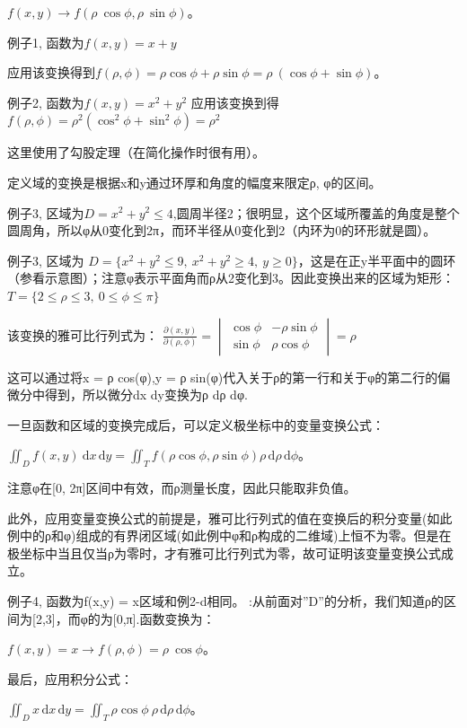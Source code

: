 \documentclass[UTF-8]{ctexart}
\begin{document}
$f(x,y) \rightarrow f(\rho \ \cos \phi,\rho \ \sin \phi )$。

例子1,
函数为$f(x,y) = x + y$

应用该变换得到$f(\rho, \phi) = \rho \cos \phi + \rho \sin \phi = \rho \ (\cos \phi + \sin \phi )$。

例子2,
函数为$f(x,y) = x^2 + y^2$
应用该变换到得$f(\rho, \phi) = \rho^2 (\cos^2 \phi + \sin^2 \phi) = \rho^2$

这里使用了勾股定理（在简化操作时很有用）。

定义域的变换是根据x和y通过环厚和角度的幅度来限定ρ, φ的区间。

例子3,
区域为$D = x^2 + y^2 \le 4$,圆周半径2；很明显，这个区域所覆盖的角度是整个圆周角，所以φ从0变化到2π，而环半径从0变化到2（内环为0的环形就是圆）。

例子3,
区域为 $D = \{ x^2 + y^2 \le 9, \ x^2 + y^2 \ge 4, \ y \ge 0 \}$，这是在正y半平面中的圆环（参看示意图）；注意φ表示平面角而ρ从2变化到3。因此变换出来的区域为矩形：$T = \{ 2 \le \rho \le 3, \ 0 \le \phi \le \pi \}$

该变换的雅可比行列式为：
$\frac{\partial (x,y)}{\partial (\rho, \phi)} =
\begin{vmatrix}
\cos \phi & - \rho \sin \phi \\
\sin \phi & \rho \cos \phi
\end{vmatrix} = \rho$

这可以通过将x = ρ cos(φ),y = ρ sin(φ)代入关于ρ的第一行和关于φ的第二行的偏微分中得到，所以微分dx dy变换为ρ dρ dφ.

一旦函数和区域的变换完成后，可以定义极坐标中的变量变换公式：

$\iint_D f(x,y) \ \mathrm{d}x\, \mathrm{d}y = \iint_T f(\rho \cos \phi, \rho \sin \phi) \rho \, \mathrm{d} \rho\, \mathrm{d} \phi$。

注意φ在[0, 2π]区间中有效，而ρ测量长度，因此只能取非负值。

此外，应用变量变换公式的前提是，雅可比行列式的值在变换后的积分变量(如此例中的ρ和φ)组成的有界闭区域(如此例中φ和ρ构成的二维域)上恒不为零。但是在极坐标中当且仅当ρ为零时，才有雅可比行列式为零，故可证明该变量变换公式成立。

例子4,
函数为f(x,y) = x区域和例2-d相同。
:从前面对''D''的分析，我们知道ρ的区间为[2,3]，而φ的为[0,π].函数变换为：

$f(x,y) = x \longrightarrow f(\rho,\phi) = \rho \ \cos \phi$。

最后，应用积分公式：

$\iint_D x \, \mathrm{d}x\, \mathrm{d}y = \iint_T \rho \cos \phi \ \rho \, \mathrm{d}\rho\, \mathrm{d}\phi$。
\end{document}
